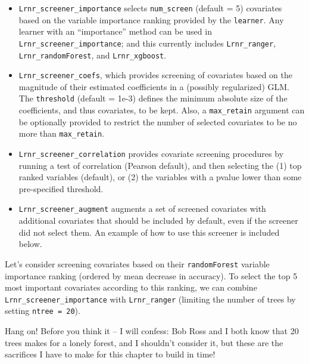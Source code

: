 \documentclass[12pt, krantz2,]{krantz}
\providecommand{\tightlist}{%
  \setlength{\itemsep}{0pt}\setlength{\parskip}{0pt}}
\theoremstyle{definition}
\theoremstyle{definition}
\theoremstyle{definition}
\newcommand{\1}{\mathbbm{1}}
\begin{document}
\begin{itemize}
\tightlist
\item
  \texttt{Lrnr\_screener\_importance} selects \texttt{num\_screen} (default = 5) covariates
  based on the variable importance ranking provided by the \texttt{learner}. Any
  learner with an ``importance'' method can be used in \texttt{Lrnr\_screener\_importance};
  and this currently includes \texttt{Lrnr\_ranger}, \texttt{Lrnr\_randomForest}, and
  \texttt{Lrnr\_xgboost}.
\item
  \texttt{Lrnr\_screener\_coefs}, which provides screening of covariates based on the
  magnitude of their estimated coefficients in a (possibly regularized) GLM.
  The \texttt{threshold} (default = 1e-3) defines the minimum absolute size of the
  coefficients, and thus covariates, to be kept. Also, a \texttt{max\_retain} argument
  can be optionally provided to restrict the number of selected covariates to
  be no more than \texttt{max\_retain}.
\item
  \texttt{Lrnr\_screener\_correlation} provides covariate screening procedures by
  running a test of correlation (Pearson default), and then selecting the (1)
  top ranked variables (default), or (2) the variables with a pvalue lower than
  some pre-specified threshold.
\item
  \texttt{Lrnr\_screener\_augment} augments a set of screened covariates with additional
  covariates that should be included by default, even if the screener did not
  select them. An example of how to use this screener is included below.
\end{itemize}

Let's consider screening covariates based on their \texttt{randomForest} variable
importance ranking (ordered by mean decrease in accuracy). To select the top
5 most important covariates according to this ranking, we can combine
\texttt{Lrnr\_screener\_importance} with \texttt{Lrnr\_ranger} (limiting the number of trees by
setting \texttt{ntree\ =\ 20}).

Hang on! Before you think it -- I will confess: Bob Ross and I both know that 20
trees makes for a lonely forest, and I shouldn't consider it, but these are the
sacrifices I have to make for this chapter to build in time!
\end{document}
